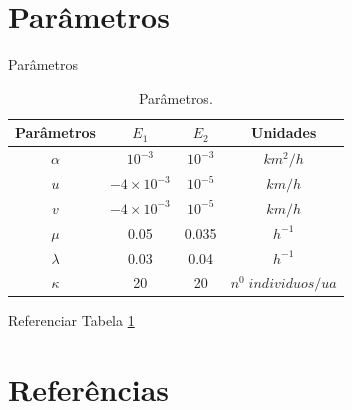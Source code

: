 \section{Parâmetros}
\begin{frame}{Parâmetros}
\begin{table}[H]
\centering
\begin{tabular}{|c|c|c|c|}
\hline \hline
	Parâmetros 	& 		$E_1$ 		& $E_2$		& 	Unidades 		\\
\hline \hline
	$\alpha$ 	& 	$10^{-3}$ 		& 	$10^{-3}$ 	& 	$km^2/h$		\\
\hline
	$u$ 		& 	$-4\times 10^{-3}$	& 	$10^{-5}$&		$km/h$		\\
\hline
	$v$ 		& 	$-4\times 10^{-3}$	& 	$10^{-5}$& 	$km/h$			\\
\hline
	$\mu$ 	& 		0.05 	& 		0.035 			& 	$h^{-1}$		\\
\hline
	$\lambda$ & 		0.03 	& 	0.04 				& 	$h^{-1}$		\\
\hline
	$\kappa$ 	&	 	20		& 20		& $n^0 \; individuos/ua$\\
\hline \hline
\end{tabular}
\caption{Parâmetros.} \label{tab:tabela_p}
\end{table}
Referenciar Tabela \ref{tab:tabela_p}
\end{frame}

\section{Referências}



